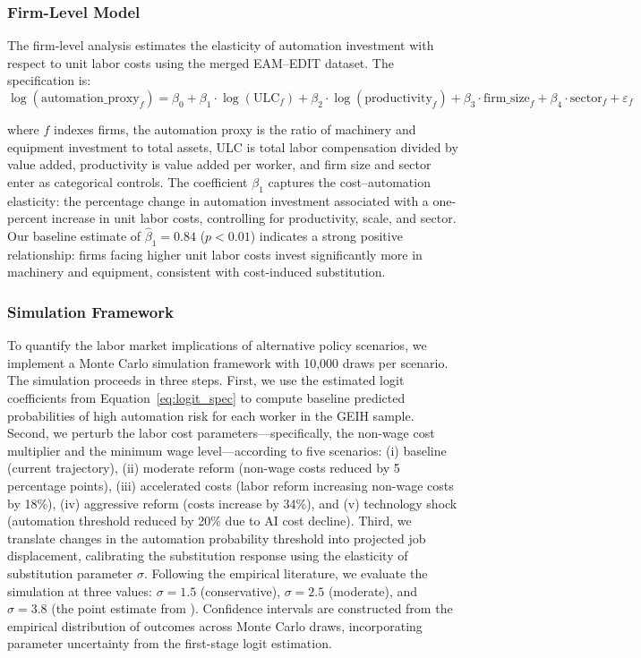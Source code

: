 \documentclass{article}
\begin{document}
\subsubsection*{Firm-Level Model}

The firm-level analysis estimates the elasticity of automation investment with respect to unit labor costs using the merged EAM--EDIT dataset. The specification is:
\begin{equation}
\log(\text{automation\_proxy}_{f}) = \beta_0 + \beta_1 \cdot \log(\text{ULC}_{f}) + \beta_2 \cdot \log(\text{productivity}_{f}) + \beta_3 \cdot \text{firm\_size}_{f} + \beta_4 \cdot \text{sector}_{f} + \varepsilon_{f}
\label{eq:firm}
\end{equation}

\noindent where $f$ indexes firms, the automation proxy is the ratio of machinery and equipment investment to total assets, ULC is total labor compensation divided by value added, productivity is value added per worker, and firm size and sector enter as categorical controls. The coefficient $\beta_1$ captures the cost--automation elasticity: the percentage change in automation investment associated with a one-percent increase in unit labor costs, controlling for productivity, scale, and sector. Our baseline estimate of $\hat{\beta}_1 = 0.84$ ($p < 0.01$) indicates a strong positive relationship: firms facing higher unit labor costs invest significantly more in machinery and equipment, consistent with cost-induced substitution.

\subsubsection*{Simulation Framework}

To quantify the labor market implications of alternative policy scenarios, we implement a Monte Carlo simulation framework with 10,000 draws per scenario. The simulation proceeds in three steps. First, we use the estimated logit coefficients from Equation~\ref{eq:logit_spec} to compute baseline predicted probabilities of high automation risk for each worker in the GEIH sample. Second, we perturb the labor cost parameters---specifically, the non-wage cost multiplier and the minimum wage level---according to five scenarios: (i) baseline (current trajectory), (ii) moderate reform (non-wage costs reduced by 5 percentage points), (iii) accelerated costs (labor reform increasing non-wage costs by 18\%), (iv) aggressive reform (costs increase by 34\%), and (v) technology shock (automation threshold reduced by 20\% due to AI cost decline). Third, we translate changes in the automation probability threshold into projected job displacement, calibrating the substitution response using the elasticity of substitution parameter $\sigma$. Following the empirical literature, we evaluate the simulation at three values: $\sigma = 1.5$ (conservative), $\sigma = 2.5$ (moderate), and $\sigma = 3.8$ (the point estimate from \cite{cheng2021elasticity}). Confidence intervals are constructed from the empirical distribution of outcomes across Monte Carlo draws, incorporating parameter uncertainty from the first-stage logit estimation.
\end{document}
